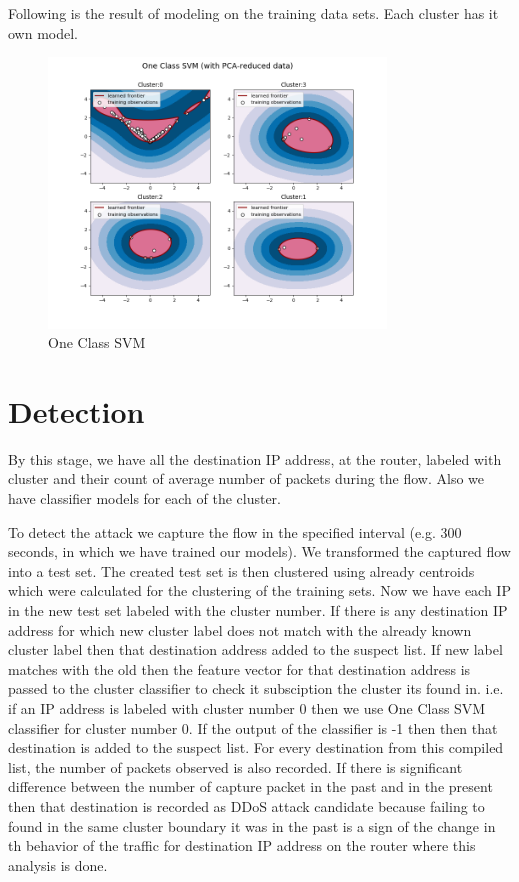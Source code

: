 \documentclass[12pt,oneside,a4paper]{article}
\begin{document}
Following is the result of modeling on the training data sets. Each cluster has it own model.

\begin{figure}[H]
\centering
\includegraphics[width=0.80\textwidth]{one-class-SVM.png}
\caption{One Class SVM} \label{fig:one-class-SVM}
\end{figure}


\section{Detection}

By this stage, we have all the destination IP address, at the router, labeled with cluster and their count of average number of packets during the flow. Also we have classifier models for each of the cluster.

To detect the attack we capture the flow in the specified interval (e.g. 300 seconds, in which we have trained our models). We transformed the captured flow into a test set. The created test set is then clustered using already centroids which were calculated for the clustering of the training sets. Now we have each IP in the new test set labeled with the cluster number. If there is any destination IP address for which new cluster label does not match with the already known cluster label then that destination address added to the suspect list. If new label matches with the old then the feature vector for that destination address is passed to the cluster classifier to check it subsciption the cluster its found in. i.e. if an IP address is labeled with cluster number 0 then we use One Class SVM classifier for cluster number 0. If the output of the classifier is -1 then then that destination is added to the suspect list. For every destination from this compiled list, the number of packets observed is also recorded. If there is significant difference between the number of capture packet in the past and in the present then that destination is recorded as DDoS attack candidate because failing to found in the same cluster boundary it was in the past is a sign of the change in th behavior of the traffic for destination IP address on the router where this analysis is done.
\end{document}
